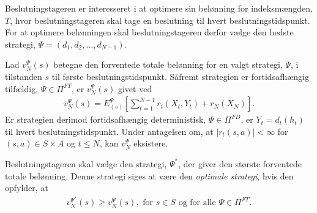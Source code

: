 

Beslutningstageren er interesseret i at optimere sin belønning for indeksmængden, $T$, hvor beslutningstageren skal tage en beslutning til hvert beslutningstidspunkt. For at optimere belønningen skal beslutningstageren derfor vælge den bedste strategi, $\Psi=(d_1, d_2,\dots, d_{N-1})$.

Lad $v_N^\Psi(s)$ betegne den forventede totale belønning for en valgt strategi, $\Psi$, i tilstanden $s$ til første beslutningstidspunkt. Såfremt strategien er fortidsafhængig tilfældig, $\Psi\in \Pi^{FT}$, er $v_N^\Psi(s)$ givet ved
\begin{align*}
    v_N^{\Psi}(s)=E_{(s)}^{\Psi}\left[\sum_{t=1}^{N-1}r_t(X_t, Y_t)+r_N(X_N)\right].
\end{align*}
Er strategien derimod fortidsafhængig deterministisk, $\Psi\in\Pi^{FD}$, er $Y_t = d_t(h_t)$ til hvert beslutningstidspunkt. Under antagelsen om, at $|r_t(s,a)| < \infty$ for $(s,a) \in S \times A$ og $t \leq N$, kan $v_N^\Psi$ eksistere. 




Beslutningstageren skal vælge den strategi, $\Psi^*$, der giver den største forventede totale belønning. Denne strategi siges at være den \textit{optimale strategi}, hvis den opfylder, at %
\begin{align*}
    v_N^{\Psi^*}(s)\geq v_N^{\Psi}(s), \text{ for } s\in S \text{ og for alle } \Psi\in \Pi^{FT}.
\end{align*}


